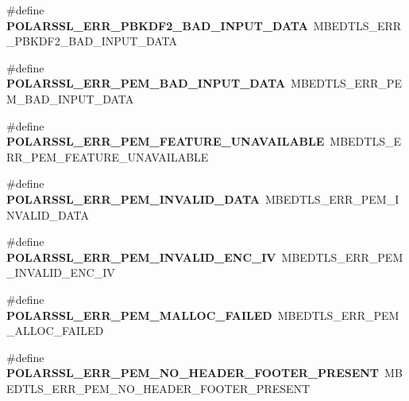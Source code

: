 \begin{DoxyCompactItemize}
\item 
\mbox{\label{compat-1_83_8h_a32afaed6ae1467f54e0ca0d2550329f9}} 
\#define {\bfseries P\+O\+L\+A\+R\+S\+S\+L\+\_\+\+E\+R\+R\+\_\+\+P\+B\+K\+D\+F2\+\_\+\+B\+A\+D\+\_\+\+I\+N\+P\+U\+T\+\_\+\+D\+A\+TA}~M\+B\+E\+D\+T\+L\+S\+\_\+\+E\+R\+R\+\_\+\+P\+B\+K\+D\+F2\+\_\+\+B\+A\+D\+\_\+\+I\+N\+P\+U\+T\+\_\+\+D\+A\+TA
\item 
\mbox{\label{compat-1_83_8h_ae178eb5fe3590fc7bb43c16ba1874c2f}} 
\#define {\bfseries P\+O\+L\+A\+R\+S\+S\+L\+\_\+\+E\+R\+R\+\_\+\+P\+E\+M\+\_\+\+B\+A\+D\+\_\+\+I\+N\+P\+U\+T\+\_\+\+D\+A\+TA}~M\+B\+E\+D\+T\+L\+S\+\_\+\+E\+R\+R\+\_\+\+P\+E\+M\+\_\+\+B\+A\+D\+\_\+\+I\+N\+P\+U\+T\+\_\+\+D\+A\+TA
\item 
\mbox{\label{compat-1_83_8h_a944af87c629fac2a22082a49be42ae3e}} 
\#define {\bfseries P\+O\+L\+A\+R\+S\+S\+L\+\_\+\+E\+R\+R\+\_\+\+P\+E\+M\+\_\+\+F\+E\+A\+T\+U\+R\+E\+\_\+\+U\+N\+A\+V\+A\+I\+L\+A\+B\+LE}~M\+B\+E\+D\+T\+L\+S\+\_\+\+E\+R\+R\+\_\+\+P\+E\+M\+\_\+\+F\+E\+A\+T\+U\+R\+E\+\_\+\+U\+N\+A\+V\+A\+I\+L\+A\+B\+LE
\item 
\mbox{\label{compat-1_83_8h_abf162457129ad95e973e02b4c72effdc}} 
\#define {\bfseries P\+O\+L\+A\+R\+S\+S\+L\+\_\+\+E\+R\+R\+\_\+\+P\+E\+M\+\_\+\+I\+N\+V\+A\+L\+I\+D\+\_\+\+D\+A\+TA}~M\+B\+E\+D\+T\+L\+S\+\_\+\+E\+R\+R\+\_\+\+P\+E\+M\+\_\+\+I\+N\+V\+A\+L\+I\+D\+\_\+\+D\+A\+TA
\item 
\mbox{\label{compat-1_83_8h_aee09ae2e237315b0fa0ad7071f07abcf}} 
\#define {\bfseries P\+O\+L\+A\+R\+S\+S\+L\+\_\+\+E\+R\+R\+\_\+\+P\+E\+M\+\_\+\+I\+N\+V\+A\+L\+I\+D\+\_\+\+E\+N\+C\+\_\+\+IV}~M\+B\+E\+D\+T\+L\+S\+\_\+\+E\+R\+R\+\_\+\+P\+E\+M\+\_\+\+I\+N\+V\+A\+L\+I\+D\+\_\+\+E\+N\+C\+\_\+\+IV
\item 
\mbox{\label{compat-1_83_8h_aa5881696f05e65e7aa94883c933917f5}} 
\#define {\bfseries P\+O\+L\+A\+R\+S\+S\+L\+\_\+\+E\+R\+R\+\_\+\+P\+E\+M\+\_\+\+M\+A\+L\+L\+O\+C\+\_\+\+F\+A\+I\+L\+ED}~M\+B\+E\+D\+T\+L\+S\+\_\+\+E\+R\+R\+\_\+\+P\+E\+M\+\_\+\+A\+L\+L\+O\+C\+\_\+\+F\+A\+I\+L\+ED
\item 
\mbox{\label{compat-1_83_8h_aba55809b3ae6781d4ab92ccdfbe54a9c}} 
\#define {\bfseries P\+O\+L\+A\+R\+S\+S\+L\+\_\+\+E\+R\+R\+\_\+\+P\+E\+M\+\_\+\+N\+O\+\_\+\+H\+E\+A\+D\+E\+R\+\_\+\+F\+O\+O\+T\+E\+R\+\_\+\+P\+R\+E\+S\+E\+NT}~M\+B\+E\+D\+T\+L\+S\+\_\+\+E\+R\+R\+\_\+\+P\+E\+M\+\_\+\+N\+O\+\_\+\+H\+E\+A\+D\+E\+R\+\_\+\+F\+O\+O\+T\+E\+R\+\_\+\+P\+R\+E\+S\+E\+NT

\end{DoxyCompactItemize}
